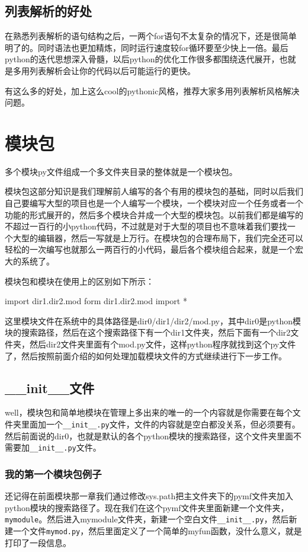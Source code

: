 \documentclass[12pt,oneside]{book}
\begin{document}
\begin{common-format}
\section{列表解析的好处}
在熟悉列表解析的语句结构之后，一两个for语句不太复杂的情况下，还是很简单明了的。同时语法也更加精炼，同时运行速度较for循环要至少快上一倍。最后python的迭代思想深入骨髓，以后python的优化工作很多都围绕迭代展开，也就是多用列表解析会让你的代码以后可能运行的更快。

有这么多的好处，加上这么cool的pythonic风格，推荐大家多用列表解析风格解决问题。





\chapter{模块包}
多个模块py文件组成一个多文件夹目录的整体就是一个模块包。

模块包这部分知识是我们理解前人编写的各个有用的模块包的基础，同时以后我们自己要编写大型的项目也是一个人编写一个模块，一个模块对应一个任务或者一个功能的形式展开的，然后多个模块合并成一个大型的模块包。以前我们都是编写的不超过一百行的小python代码，不过就是对于大型的项目也不意味着我们要找一个大型的编辑器，然后一写就是上万行。在模块包的合理布局下，我们完全还可以轻松的一次编写也就那么一两百行的小代码，最后各个模块组合起来，就是一个宏大的系统了。

模块包和模块在使用上的区别如下所示：
\begin{tcbpython}
import  dir1.dir2.mod
form dir1.dir2.mod import *
\end{tcbpython}
这里模块文件在系统中的具体路径是dir0/dir1/dir2/mod.py，其中dir0是python模块的搜索路径，然后在这个搜索路径下有一个dir1文件夹，然后下面有一个dir2文件夹，然后dir2文件夹里面有个mod.py文件，这样python程序就找到这个py文件了，然后按照前面介绍的如何处理加载模块文件的方式继续进行下一步工作。


\section{\_{}\_{}init\_{}\_{}文件}
well，模块包和简单地模块在管理上多出来的唯一的一个内容就是你需要在每个文件夹里面加一个\verb+__init__.py+文件，文件的内容就是空白都没关系，但必须要有。然后前面说的dir0，也就是默认的各个python模块的搜索路径，这个文件夹里面不需要加\verb+__init__.py+文件。


\subsection{我的第一个模块包例子}
还记得在前面模块那一章我们通过修改sys.path把主文件夹下的pymf文件夹加入python模块的搜索路径了。现在我们在这个pymf文件夹里面新建一个文件夹，\verb+mymodule+。然后进入mymodule文件夹，新建一个空白文件\verb+__init__.py+，然后新建一个文件\verb+mymod.py+，然后里面定义了一个简单的myfun函数，没什么意义，就是打印了一段信息。


\end{common-format}
\end{document}
